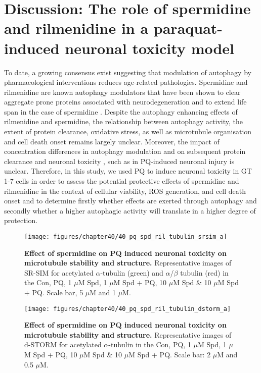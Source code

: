 \section{Discussion: The role of spermidine and rilmenidine in a paraquat-induced neuronal toxicity model}
To date, a growing consensus exist suggesting that modulation of autophagy by pharmacological interventions reduces age-related pathologies. Spermidine and rilmenidine are known autophagy modulators that have been shown to clear aggregate prone proteins associated with neurodegeneration \citep{Bhukel2017,Buttner2014,Rose2010,Sigrist2014} and to extend life span in the case of spermidine \citep{Madeo2010,Morselli2009}. Despite the autophagy enhancing effects of rilmenidine and spermidine, the relationship between autophagy activity, the extent of protein clearance, oxidative stress, as well as microtubule organisation and cell death onset remains largely unclear. Moreover, the impact of concentration differences in autophagy modulation and on subsequent protein clearance and neuronal toxicity , such as in PQ-induced neuronal injury is unclear. Therefore, in this study, we used PQ to induce neuronal toxicity in GT 1-7 cells in order to assess the potential protective effects of spermidine and rilmenidine in the context of cellular viability, ROS generation, and cell death onset and to determine firstly whether effects are exerted through autophagy and secondly whether a higher autophagic activity will translate in a higher degree of protection. 

\begin{landscape}\centering
\begin{figure}[!htbp]
\vspace*{\fill}
\centering
  \texttt{[image: figures/chapter40/40\_pq\_spd\_ril\_tubulin\_srsim\_a]}
  \caption[Effect of spermidine on PQ induced neuronal toxicity on microtubule stability and structure]{\textbf{Effect of spermidine on PQ induced neuronal toxicity on microtubule stability and structure.} Representative images of SR-SIM for acetylated $\alpha$-tubulin (green) and $\alpha$/$\beta$ tubulin (red) in the Con, PQ, 1 $\mu$M Spd, 1 $\mu$M Spd + PQ, 10 $\mu$M Spd \& 10 $\mu$M Spd + PQ. Scale bar, 5 $\mu$M and 1 $\mu$M.}
  \label{fig:40_pq_spd_ril_tubulin_srsim_a}
\end{figure} 
\vfill
\end{landscape}

\begin{landscape}
\begin{figure}[!htbp]
\center
  \texttt{[image: figures/chapter40/40\_pq\_spd\_ril\_tubulin\_dstorm\_a]}
  \caption[Effect of spermidine on PQ induced neuronal toxicity on microtubule stability and structure]{\textbf{Effect of spermidine on PQ induced neuronal toxicity on microtubule stability and structure.} Representative images of d-STORM for acetylated $\alpha$-tubulin in the Con, PQ, 1 $\mu$M Spd, 1 $\mu$M Spd + PQ, 10 $\mu$M Spd \& 10 $\mu$M Spd + PQ. Scale bar: 2 $\mu$M and 0.5 $\mu$M.}
  \label{fig:40_pq_spd_ril_tubulin_dstorm_a}
\end{figure} 
\end{landscape}

